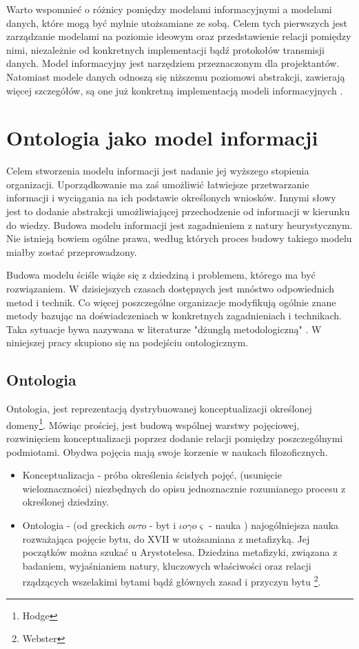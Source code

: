 \documentclass[12pt,a4paper,notitlepage]{article}
\begin{document}
Warto wspomnieć o różnicy pomiędzy modelami informacyjnymi a modelami danych,
które mogą być mylnie utożsamiane ze sobą. Celem tych pierwszych jest 
zarządzanie modelami na poziomie ideowym oraz przedstawienie relacji pomiędzy
nimi, niezależnie od konkretnych implementacji bądź protokołów transmisji
danych. Model informacyjny jest narzędziem przeznaczonym dla projektantów.
Natomiast modele danych odnoszą się niższemu poziomowi abstrakcji, zawierają
więcej szczegółów, są one już konkretną implementacją modeli informacyjnych 
\cite{RFC3444}.



\section{Ontologia jako model informacji}
Celem stworzenia modelu informacji jest nadanie jej wyższego stopienia organizacji. Uporządkowanie ma zaś umożliwić łatwiejsze przetwarzanie informacji i wyciągania na ich podstawie określonych wniosków. Innymi słowy jest to dodanie abstrakcji umożliwiającej przechodzenie od informacji w kierunku do wiedzy. Budowa modelu informacji jest zagadnieniem z natury heurystycznym. Nie istnieją bowiem ogólne prawa, według których proces budowy takiego modelu miałby zostać przeprowadzony. 

Budowa modelu ściśle wiąże się z dziedziną i problemem, którego ma być rozwiązaniem. W dzisiejszych czasach dostępnych jest mnóstwo odpowiednich metod i technik. Co więcej poszczególne organizacje modyfikują ogólnie znane metody bazując na doświadczeniach w konkretnych zagadnieniach i technikach. Taka sytuacje bywa nazywana w literaturze "dżunglą metodologiczną" \cite{Verhoef}. W niniejszej pracy skupiono się na podejściu ontologicznym.

\subsection{Ontologia}
Ontologia, jest reprezentacją dystrybuowanej konceptualizacji określonej domeny\footnote{Hodge}. Mówiąc prościej, jest budową wspólnej warstwy pojęciowej, rozwinięciem konceptualizacji poprzez dodanie relacji pomiędzy poszczególnymi podmiotami. Obydwa pojęcia mają swoje korzenie w naukach filozoficznych.
\begin{itemize}
   \item Konceptualizacja - próba określenia ścisłych pojęć, (usunięcie wieloznaczności) niezbędnych do opisu jednoznacznie rozumianego procesu z określonej dziedziny.
	\item Ontologia - (od greckich $o \nu \tau o$ - byt i $\iota o\gamma o\varsigma$ - nauka ) najogólniejsza nauka rozważająca pojęcie bytu, do XVII w utożsamiana z metafizyką. Jej początków można szukać u Arystotelesa. Dziedzina metafizyki, związana z badaniem, wyjaśnianiem natury, kluczowych właściwości oraz relacji rządzących wszelakimi bytami bądź głównych zasad i przyczyn bytu \footnote{Webster}.
\end{itemize}  
\end{document}
